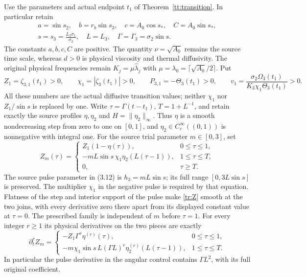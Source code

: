 Use the parameters and actual endpoint $t_1$ of
Theorem~\ref{tt:transition}. In particular retain
\[
 \begin{gathered}
 a=\sin s_2,\quad b=r_b\sin s_3,\quad
 c=A_0\cos s_*,\quad C=A_0\sin s_*,\\
 s=s_3=\frac{L_3\sigma_1}{\sigma_2},\quad
 L=L_3,\quad \Gamma=\Gamma_3=\sigma_2\sin s.
 \end{gathered}
\]
The constants $a,b,c,C$ are positive. The quantity
$\nu=\sqrt{A_0}$ remains the source time scale, whereas $d>0$
is physical viscosity and thermal diffusivity. The original physical
frequencies remain $K_j=\mu\widehat\lambda_j$ with
$\mu=\lambda_0=\lceil\sqrt{A_0}/2\rceil$.
Put
\begin{equation}\label{tr:entry}
 Z_1=\zeta_{3,1}(t_1)>0,\qquad
 \chi_1=|\zeta_3(t_1)|>0,\qquad
 P_{3,1}=-\Theta_3(t_1)>0,\qquad
 v_1=\frac{\sigma_2\Omega_3(t_1)}{K_3\chi_1\Theta_3(t_1)}>0.
\end{equation}
All these numbers are the actual diffusive transition values; neither
$\chi_1$ nor $Z_1/\sin s$ is replaced by one.
Write $\tau=\Gamma(t-t_1)$, $T=1+L^{-1}$, and retain exactly
the source profiles $\eta,\eta_2$ and $H=\|\eta_2\|_\infty$.
Thus $\eta$ is a smooth nondecreasing step from zero to one on
$[0,1]$, and $\eta_2\in C_c^\infty((0,1))$ is nonnegative
with integral one. For the source trial parameter $m\in[0,3]$, set
\begin{equation}\label{tr:Z}
 Z_m(\tau)=
 \begin{cases}
 Z_1(1-\eta(\tau)),&0\leq\tau\leq1,\\
 -mL\sin s\,\chi_1\eta_2(L(\tau-1)),&1\leq\tau\leq T,\\
 0,&\tau\geq T.
 \end{cases}
\end{equation}
The source pulse parameter in (3.12) is $h_3=mL\sin s$;
its full range $[0,3L\sin s]$ is preserved. The multiplier
$\chi_1$ in the negative pulse is required by that equation.
Flatness of the step and interior support of the pulse make
\eqref{tr:Z} smooth at the two joins, with every derivative zero
there apart from its displayed constant value at $\tau=0$.
The prescribed family is independent of $m$ before $\tau=1$.
For every integer $r\geq1$ its physical derivatives on the two
pieces are exactly
\begin{equation}\label{tr:Z_derivatives}
 \partial_t^r Z_m=
 \begin{cases}
 -Z_1\Gamma^r\eta^{(r)}(\tau),&0\leq\tau\leq1,\\
 -m\chi_1\sin s\,L(\Gamma L)^r
          \eta_2^{(r)}(L(\tau-1)),&1\leq\tau\leq T.
 \end{cases}
\end{equation}
In particular the pulse derivative in the angular control contains
$\Gamma L^2$, with its full original coefficient.

